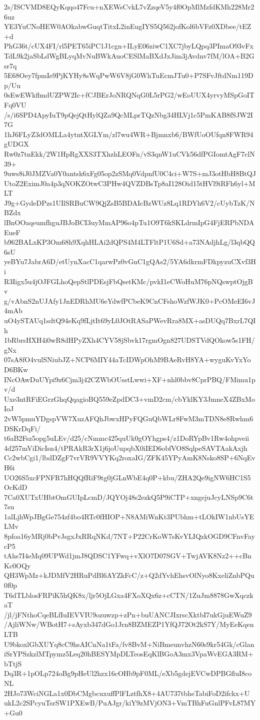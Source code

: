 2s/ISCVMD8EQyKqqo47Fcu+nXEWsCvkL7vZzqeV5y4f0OpMlMzfdKMh228Mr26uz
YE3YuCNoHEW0AOkabwGuqtTitxL2inEugIYS5Q562jofKol6bVFz0XDbee/tEZ+d
PhG36t/cUX4FI/rl5PET65iPC1J1cgn+ILyE06ziwC1XC7jbyLQpq3PImaO93vFx
TdL9k2jaSbLdWgBLyqMvNuBWkAuoCESlMaBXdJxJim3jAvdnv7fM/lOA+B2Gsr7q
5E68Oey7fpmIe9PjKYHy8sWqPwW6V8jG0WhTuEcmJTu0+P7SFvJftdNm119Dp/Uu
0sEwEWkflmdUZPW2Ic+fCJBErJoNRQNqG0L5rPG2/wEoUUX4yrvyMSpGoITFq0VU
/s/i6SPD4ApyIuT9pQejQtHylQZa9QcMLprTQzNbg34HLVj1c5PmKAB8fSJW2I7G
1hJ6FLyZ3dOMLLa4ytntXGLYm/zl7wu4WR+Bjmnxb6/BWfUoOUfqn8FWR94gUDGX
Rw0z7tnEkk/2W1HpRgXXS3TXhzhLEOFn/vS3qnW1uCVk56dfPGIomtAgF7clN39+
9uws8iJ0JMZVa0Y0antsk6xFg05op2zSMq0VdpnfU0C4ci+W7S+mJ3otHbH8BtQJ
UtoZ2EximJ0a4p3qNOKZOtwC3PHw4QVZDBsTp8aI128Oid15tHVl9iRFh6yl+MLT
J9g+GydeDPzs1UIlSRBuCW9QjZsB5BDAIcBzWUz8Lq1RDYh6V2/cUybTzK/NBZdx
lBnOOaqeumfhguJBJoBCI3uyMmAP96o4pTu1O9T6kSKLdrmIpG4FjERPbNDAEueF
b962BALxKP3Om68h9XqhHLAi2dQPS4M4LTFltP1U6Sd+a73NAdjhLg/l3qbQQ6sU
yeBYu7JabrA6D/etUynXacC1qarwPz0vGnC1gQAs2/5YA6dkrmFDkpyzuCXvf3Hi
R3Iigx5u4jOJFGLhoQepStlPDEsjFbQsetKMc/pvkI1eCWoHuM76pNQswptOjgBv
g/vAbnS2nUJAfy1JnEDRhMU6eYdwfPCbeK9CnCFshoWzfWJK0+PcOMeEI6vJ4mAb
uO4ySTAUq1sdtQ94eKq9fLjtIt69yL0JOtRASaPWevRra8MX+asDUQq7BxrL7QIh
1bRbrsHXH4i0wR8dHPyZXh4CYV58jSbvk17rgmOgn827UDSTVdQOkow5s1FH/gNx
07sA8fO4vulSNiubJZ+NCP6MIY44aTcIDWpOhM9BAeRvH8YA+wyguKvYxYoD6BKw
INcOAwDuUYpi9z6Cjm3j42CZWbOUsstLwwi+XF+nhl0bbv8CprPBQ/FMimu1pv/d
Uxe3ntRFiEGrzGhqQqagioBQ559eZpdDC3+vmD2cm/cbYklKY3JmneX4ZBxMoIoJ
2vW5pmuYDgspVW7XuzAFQhJbwxHPyFQGuQbWLr8FwM3mTDN8e8Rwhm6DSKrDqFi/
t6aB2Fsz5opg5uLEv/d25/cNmmc425quUk0gOYhgps4/z1DoRYpBv1Rw4ohpveii
4d257mViDicIsn4/tPRAkR3rX1j6joUupqbX0iIED6obfVO8SqlpeSAVTAakAxjh
Cc2wbCgi1/lbdDZgF7vrVR9VVYKq2roxaIG/ZFK45YPyAmK8Nsko8SP+6NqEvH6i
UO26S5xcFPNFR7hHQQfRiF9tg0jGLnWbE4q0P+kbu/ZHA2Qe9igNW6HC1S5OcKdD
7Ca0XUTxUHbtOmGUIpLcmD/JQYOj48s2ezkQ5P9iCTP+xngejuJcyLNSp9C6t7su
1alLjhWpJBgGe754zf4bo4RTc0fHIOP+N8AMiWnKt3PUbhm+tLOkIW1nbUsYELMv
8pfoa16yMRj0bPvJsgxJxRRqNKd/7NT+P22CrKoW7sKvYLIQzkOGD9CFnvFaycP5
tAhs7I4eMq09UPWd1jmJ8QDSC1YFwq+vXlO7D07SGV+TwjAVK8Nz2++cBnKc0OQy
QH3WpMz+kJDMfV2HRuPdBl6AYZkFcC/z+Q2dYvhEhsvOlNyo8KxeliZnbPQu0f0p
T6dTLblosFRPiK5hQK8x/ljr5OjLGxa4FXoXQx6z+cCTN/1ZuJm8878GwXqczkaT
/jl/jFNthoCqeBLfIuIEVVIU9ozuwzp+zPn+buUANCJIxrscXktbI7ukGjuEWuZ9
/AjliWNw/WBotH7+sAyxb347dGo1Jrn8BZMEZP1YfQJ72Ot2kS7Y/MyEeKqenLTB
U9bkoxlGbXUYq8cC9hsAICnNa1tFa/fv8BvM+NiBmeunvhzN60s9kr54Gk/cGlan
iSrYPSzkzlMTpymz5Leq20hBESYMpDLTeosEqKlBGoA3mx3VpaWvEGA3RM+bTtjS
Dq3R+1pOLp724oBg9pHeUl2hzx16cOHb9pF0ML/eXb5gdejEVCwDPBGfluI8coNL
2HJo73WciNGLa1x0DbCMgbcuxuffPlFLztfhX8+4AU737tbheTabiFoD2ifckx+U
ukL2c2SPcyuTsrSW1PXEwB/PuAJgr/kiY9zMVjON3+VmTBhFuGnlPFvL87MY+Gu0
